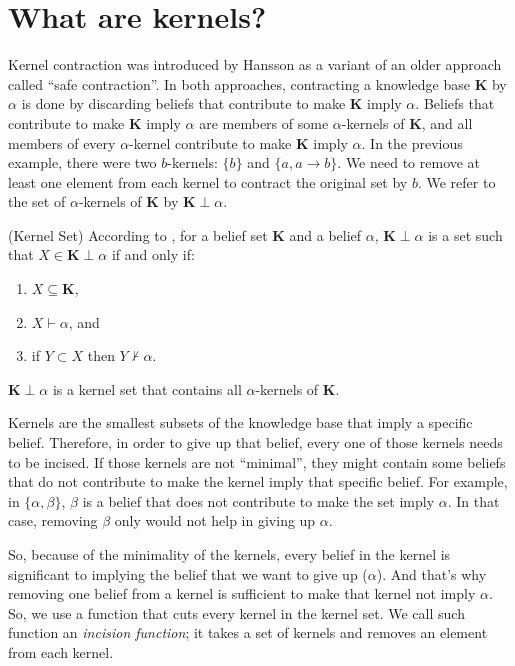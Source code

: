 \section{What are kernels?}
Kernel contraction was introduced by Hansson\cite{kernel} as a variant of an older approach called ``safe contraction''\cite{safe}. In both approaches, contracting a knowledge base \textbf{K} by $\alpha$ is done by discarding beliefs that contribute to make \textbf{K} imply $\alpha$. Beliefs that contribute to make \textbf{K} imply $\alpha$ are members of some $\alpha$-kernels of \textbf{K}, and all members of every $\alpha$-kernel contribute to make \textbf{K} imply $\alpha$. In the previous example, there were two $b$-kernels: $\lbrace b \rbrace$ and $\lbrace a, a \rightarrow b \rbrace$. We need to remove at least one element from each kernel to contract the original set by $b$. We refer to the set of $\alpha$-kernels of \textbf{K} by $\textbf{K} \perp \alpha$.
\begin{defn}(Kernel Set)
According to \cite{hansson}, for a belief set \textbf{K} and a belief $\alpha$, $\textbf{K} \perp \alpha$ is a set such that $X \in \textbf{K} \perp \alpha$ if and only if:
\begin{enumerate}
\item $X \subseteq \textbf{K}$,
\item $X \vdash \alpha$, and
\item if $Y \subset X$ then $Y \nvdash \alpha$.
\end{enumerate}
$\textbf{K} \perp \alpha$ is a kernel set that contains all $\alpha$-kernels of \textbf{K}.
\end{defn}
Kernels are the smallest subsets of the knowledge base that imply a specific belief. Therefore, in order to give up that belief, every one of those kernels needs to be incised. If those kernels are not ``minimal'', they might contain some beliefs that do not contribute to make the kernel imply that specific belief. For example, in $\lbrace \alpha, \beta \rbrace$, $\beta$ is a belief that does not contribute to make the set imply $\alpha$. In that case, removing $\beta$ only would not help in giving up $\alpha$. 

So, because of the minimality of the kernels, every belief in the kernel is significant to implying the belief that we want to give up ($\alpha$). And that's why removing one belief from a kernel is sufficient to make that kernel not imply $\alpha$. So, we use a function that cuts every kernel in the kernel set. We call such function an \textit{incision function}; it takes a set of kernels and removes an element from each kernel. 


